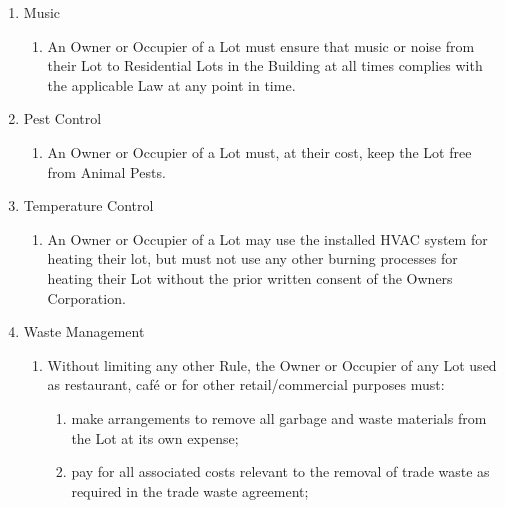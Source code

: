 \documentclass{article}
\begin{document}
\begin{enumerate}[label=\arabic*.]
\begin{enumerate}[label=\arabic{enumi}.\arabic*.]
\item  Music

\begin{enumerate}[label=(\arabic*)]

\item  An Owner or Occupier of a Lot must ensure that music or noise from their Lot to Residential Lots in the Building at all times complies with the applicable Law at any point in time.

\end{enumerate}

\item  Pest Control

\begin{enumerate}[label=(\arabic*)]

\item  An Owner or Occupier of a Lot must, at their cost, keep the Lot free from Animal Pests.

\end{enumerate}

\item  Temperature Control

\begin{enumerate}[label=(\arabic*)]

\item  An Owner or Occupier of a Lot may use the installed HVAC system for heating their lot, but must not use any other burning processes for heating their Lot without the prior written consent of the Owners Corporation.

\end{enumerate}

\item  Waste Management

\begin{enumerate}[label=(\arabic*)]

\item  Without limiting any other Rule, the Owner or Occupier of any Lot used as restaurant, café or for other retail/commercial purposes must:

\begin{enumerate}[label=(\alph*)]

\item  make arrangements to remove all garbage and waste materials from the Lot at its own expense;

\item  pay for all associated costs relevant to the removal of trade waste as required in the trade waste agreement;


\end{enumerate}
\end{enumerate}
\end{enumerate}
\end{enumerate}
\end{document}
